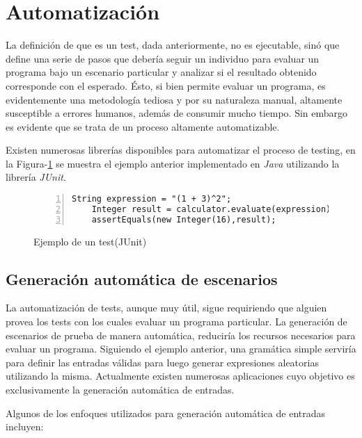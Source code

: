 \section{Automatizaci\'on}
\label{sec:preliminares.testing.automation}

La definici\'on de que es un test, dada anteriormente, no es ejecutable, sin\'o que define una serie de pasos que deber\'ia seguir un individuo para evaluar un programa bajo un escenario particular y analizar si el resultado obtenido corresponde con el esperado. \'Esto, si bien permite evaluar un programa, es evidentemente una metodolog\'ia tediosa y por su naturaleza manual, altamente susceptible a errores humanos, adem\'as de consumir mucho tiempo. Sin embargo es evidente que se trata de un proceso altamente automatizable.

Existen numerosas librer\'ias disponibles para automatizar el proceso de testing, en la Figura-\ref{figures.examples.test.junit} se muestra el ejemplo anterior implementado en \emph{Java} utilizando la librer\'ia \emph{JUnit}.

\begin{figure}
	\begin{lstlisting}[frame=single, mathescape=true,numbers=left,framexleftmargin=1.5em]
	String expression = "(1 + 3)^2";
	Integer result = calculator.evaluate(expression);
	assertEquals(new Integer(16),result);
	\end{lstlisting}
	\caption{Ejemplo de un test(JUnit)}
	\label{figures.examples.test.junit}
\end{figure}

\subsection{Generaci\'on autom\'atica de escenarios}

La automatizaci\'on de tests, aunque muy \'util, sigue requiriendo que alguien provea los tests con los cuales evaluar un programa particular. La generaci\'on de escenarios de prueba de manera autom\'atica, reducir\'ia los recursos necesarios para evaluar un programa. Siguiendo el ejemplo anterior, una gram\'atica simple servir\'ia para definir las entradas v\'alidas para luego generar expresiones aleatorias utilizando la misma. Actualmente existen numerosas aplicaciones cuyo objetivo es exclusivamente la generaci\'on autom\'atica de entradas.

Algunos de los enfoques utilizados para generaci\'on autom\'atica de entradas incluyen:

